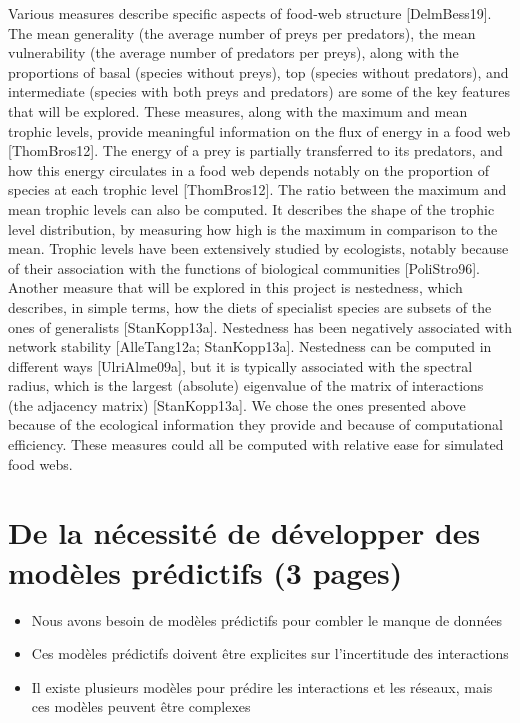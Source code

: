 Various measures describe specific aspects of food-web structure [DelmBess19].
The mean
generality (the average number of preys per predators), the mean vulnerability
(the average number of predators per preys), along with the proportions of basal
(species without preys), top (species without predators), and intermediate
(species with both preys and predators) are some of the key features that will
be explored. These measures, along with the maximum and mean trophic levels,
provide meaningful information on the flux of energy in a food web
[ThomBros12]. The energy of a prey is partially transferred to its predators,
and how this energy circulates in a food web depends notably on the proportion
of species at each trophic level [ThomBros12]. The ratio between the maximum
and mean trophic levels can also be computed. It describes the shape of the
trophic level distribution, by measuring how high is the maximum in comparison
to the mean. Trophic levels have been extensively studied by ecologists, notably
because of their association with the functions of biological communities
[PoliStro96]. Another measure that will be explored in this project is
nestedness, which describes, in simple terms, how the diets of specialist
species are subsets of the ones of generalists [StanKopp13a]. Nestedness has
been negatively associated with network stability [AlleTang12a; StanKopp13a].
Nestedness can be computed in different ways [UlriAlme09a], but it is typically
associated with the spectral radius, which is the largest (absolute) eigenvalue
of the matrix of interactions (the adjacency matrix) [StanKopp13a]. We chose the ones presented
above because of the ecological information they provide and because of
computational efficiency. These measures could all be computed with relative
ease for simulated food webs.


\section{De la nécessité de développer des modèles prédictifs (3 pages)} 

\begin{itemize}
    \item Nous avons besoin de modèles prédictifs pour combler le manque de données 
    \item Ces modèles prédictifs doivent être explicites sur l'incertitude des interactions
    \item Il existe plusieurs modèles pour prédire les interactions et les réseaux, mais ces modèles peuvent être complexes
\end{itemize}

